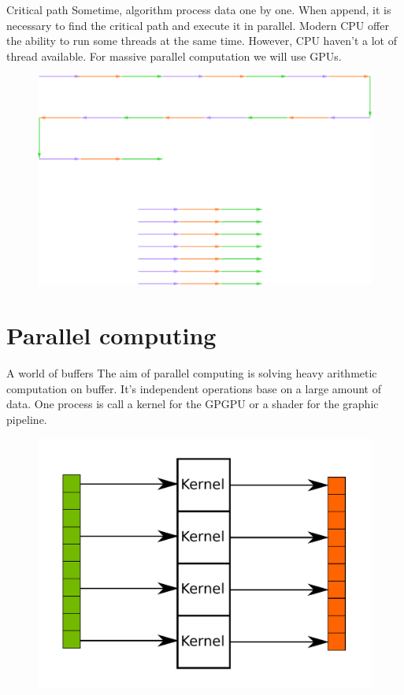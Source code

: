 \documentclass{beamer}
\begin{document}
\begin{frame}{Critical path}
	Sometime, algorithm process data one by one. When append, it is necessary to find the critical path and execute it in parallel. Modern CPU offer the ability to run some threads at the same time. However, CPU haven't a lot of thread available. For massive parallel computation we will use GPUs.
	\begin{figure}
		\includegraphics[scale=0.2]{figures/criticalPath.pdf}
	\end{figure}
\end{frame}

\section{Parallel computing}
\begin{frame}{A world of buffers}
	The aim of parallel computing is solving heavy arithmetic computation on buffer. It's independent operations base on a large amount of data. One process is call a kernel for the GPGPU or a shader for the graphic pipeline.
	\begin{figure}
		\includegraphics[scale=0.3]{figures/buffer.pdf}
	\end{figure}
\end{frame}
\end{document}

